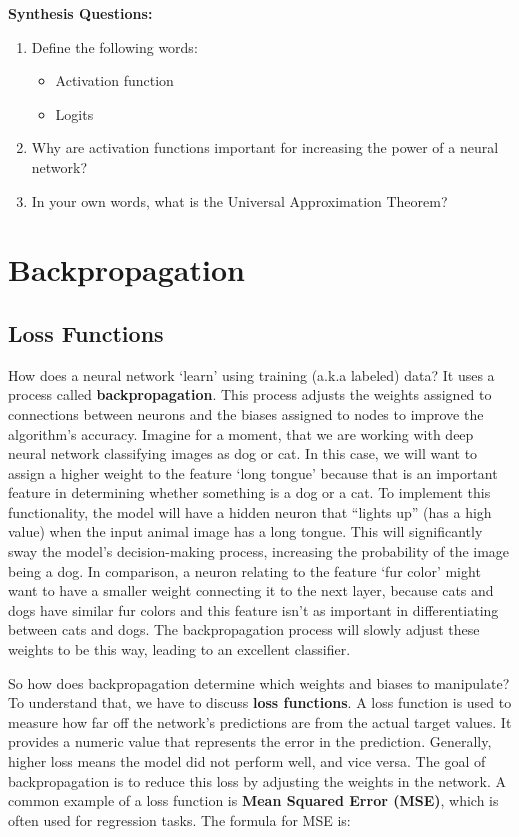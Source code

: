 \begin{questionbox}
    \textbf{Synthesis Questions:}
    \begin{enumerate}
        \item Define the following words:
        \begin{itemize}
            \item Activation function
            \item Logits
        \end{itemize}
        \item Why are activation functions important for increasing the power of a neural network?
        \item In your own words, what is the Universal Approximation Theorem?
    \end{enumerate}
\end{questionbox}

\section{Backpropagation}
\subsection{Loss Functions}
    \large How does a neural network `learn' using training (a.k.a labeled) data? It uses a process called \textbf{backpropagation}. This process adjusts the weights assigned to connections between neurons and the biases assigned to nodes to improve the algorithm's accuracy. Imagine for a moment, that we are working with deep neural network classifying images as dog or cat. In this case, we will want to assign a higher weight to the feature `long tongue' because that is an important feature in determining whether something is a dog or a cat. To implement this functionality, the model will have a hidden neuron that ``lights up'' (has a high value) when the input animal image has a long tongue. This will significantly sway the model's decision-making process, increasing the probability of the image being a dog. In comparison, a neuron relating to the feature `fur color' might want to have a smaller weight connecting it to the next layer, because cats and dogs have similar fur colors and this feature isn't as important in differentiating between cats and dogs. The backpropagation process will slowly adjust these weights to be this way, leading to an excellent classifier. 
    
    So how does backpropagation determine which weights and biases to manipulate? To understand that, we have to discuss \textbf{loss functions}. A loss function is used to measure how far off the network's predictions are from the actual target values. It provides a numeric value that represents the error in the prediction. Generally, higher loss means the model did not perform well, and vice versa. The goal of backpropagation is to reduce this loss by adjusting the weights in the network. A common example of a loss function is \textbf{Mean Squared Error (MSE)}, which is often used for regression tasks. The formula for MSE is:
    
